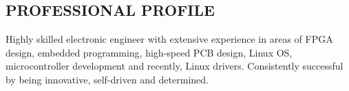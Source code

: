 \documentclass[3pt]{res}
\begin{document}
\thispagestyle{empty} %



\begin{resume}

\section{PROFESSIONAL PROFILE}
\vspace{0.1in}
  Highly skilled electronic engineer with extensive experience in areas of 
  FPGA design, embedded programming, high-speed PCB design, Linux OS, 
  microcontroller development and recently, Linux drivers. 
  Consistently successful by being innovative, self-driven and determined.


\end{resume}
\end{document}
